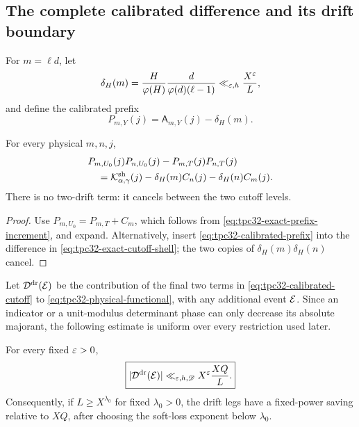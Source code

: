 \subsection{The complete calibrated difference and its drift boundary}

For \(m=\ell d\), let
\begin{equation}
 \delta_H(m)
 =\frac{H}{\varphi(H)}
  \frac{d}{\varphi(d)(\ell-1)}
 \ll_{\varepsilon,h}\frac{X^\varepsilon}{L},
 \label{eq:tpc32-row-drift}
\end{equation}
and define the calibrated prefix
\begin{equation}
 P_{m,Y}(j)=\mathsf A_{m,Y}(j)-\delta_H(m).
 \label{eq:tpc32-calibrated-prefix}
\end{equation}

\begin{proposition}
\label{prop:tpc32-calibrated-cutoff}
For every physical \(m,n,j\),
\begin{align}
 &P_{m,U_0}(j)P_{n,U_0}(j)
  -P_{m,T}(j)P_{n,T}(j)
 \notag\\
 &\quad={}
 \mathcal K^{\mathrm{sh}}_{\alpha,\gamma}(j)
 -\delta_H(m)C_n(j)-\delta_H(n)C_m(j).
 \label{eq:tpc32-calibrated-cutoff}
\end{align}
There is no two-drift term: it cancels between the two cutoff levels.
\end{proposition}

\begin{proof}
Use \(P_{m,U_0}=P_{m,T}+C_m\), which follows from
\eqref{eq:tpc32-exact-prefix-increment}, and expand.  Alternatively,
insert \eqref{eq:tpc32-calibrated-prefix} into the difference in
\eqref{eq:tpc32-exact-cutoff-shell}; the two copies of
\(\delta_H(m)\delta_H(n)\) cancel.
\end{proof}

Let \(\mathcal D^{\mathrm{dr}}(\mathcal E)\) be the contribution of the final two
terms in \eqref{eq:tpc32-calibrated-cutoff} to
\eqref{eq:tpc32-physical-functional}, with any additional event
\(\mathcal E\).  Since an indicator or a unit-modulus determinant phase can
only decrease its absolute majorant, the following estimate is uniform
over every restriction used later.

\begin{proposition}
\label{prop:tpc32-drift-boundary}
For every fixed \(\varepsilon>0\),
\begin{equation}
 \boxed{
 |\mathcal D^{\mathrm{dr}}(\mathcal E)|
 \ll_{\varepsilon,h,\mathscr D}
 X^\varepsilon\frac{XQ}{L}.}
 \label{eq:tpc32-drift-boundary}
\end{equation}
Consequently, if \(L\ge X^{\lambda_0}\) for fixed
\(\lambda_0>0\), the drift legs have a fixed-power saving relative to
\(XQ\), after choosing the soft-loss exponent below
\(\lambda_0\).
\end{proposition}


